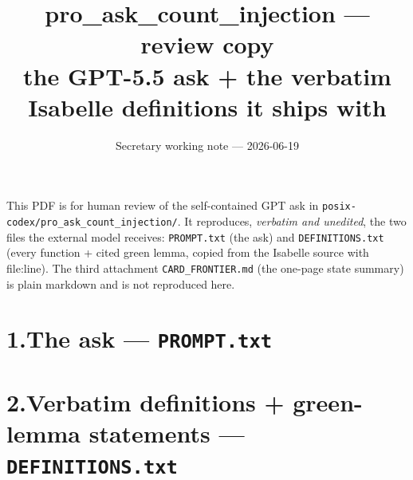 \documentclass[10pt]{article}
\title{\textbf{pro\_ask\_count\_injection --- review copy}\\[2pt]
\large the GPT-5.5 ask + the verbatim Isabelle definitions it ships with}
\author{Secretary working note --- 2026-06-19}
\date{}
\begin{document}
\maketitle

This PDF is for human review of the self-contained GPT ask in
\texttt{posix-codex/pro\_ask\_count\_injection/}. It reproduces, \emph{verbatim and unedited}, the two files the
external model receives: \texttt{PROMPT.txt} (the ask) and \texttt{DEFINITIONS.txt} (every function + cited green
lemma, copied from the Isabelle source with file:line). The third attachment \texttt{CARD\_FRONTIER.md} (the one-page
state summary) is plain markdown and is not reproduced here.

\bigskip
\section*{1.\quad The ask --- \texttt{PROMPT.txt}}


\clearpage
\section*{2.\quad Verbatim definitions + green-lemma statements --- \texttt{DEFINITIONS.txt}}

\end{document}
